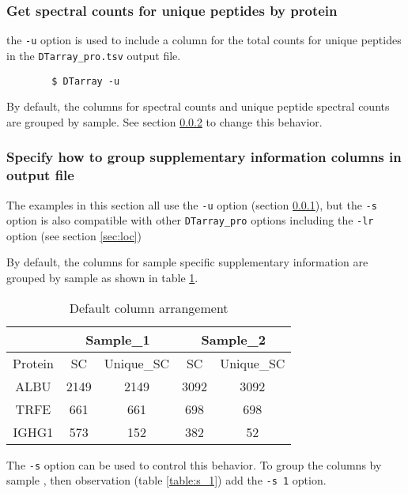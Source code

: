\documentclass[12pt]{article}
\begin{document}
	\subsubsection{Get spectral counts for unique peptides by protein} \label{sec:unique_sc}
	
	the \texttt{-u} option is used to include a column for the total counts for unique peptides in the \texttt{DTarray\_pro.tsv} output file.
	
	\begin{lstlisting}
		$ DTarray -u
	\end{lstlisting}
	
	By default, the columns for spectral counts and unique peptide spectral counts are grouped by sample.  See section \ref{sec:sup_info} to change this behavior.  
	
	\subsubsection{Specify how to group supplementary information columns in output file} \label{sec:sup_info}
	
	The examples in this section all use the \texttt{-u} option (section \ref{sec:unique_sc}), but the \texttt{-s} option is also compatible with other \texttt{DTarray\_pro} options including the \texttt{-lr} option (see section \ref{sec:loc})
	
	\bigskip
	\noindent
	By default, the columns for sample specific supplementary information are grouped by sample as shown in table \ref{table:s_0}.  
	
	\bigskip
	\begin{table}[h!]
		\centering
		\footnotesize
		\begin{tabular}{ccccc}
			\toprule
			& \multicolumn{2}{c}{Sample\_1}
			& \multicolumn{2}{c}{Sample\_2} \\
			\midrule
			Protein & SC & Unique\_SC & SC & Unique\_SC \\ 
			\midrule
			ALBU & 2149 & 2149 & 3092 & 3092 \\
			TRFE & 661 & 661 & 698 & 698 \\ 
			IGHG1 & 573 & 152 & 382 & 52 \\ 
			\toprule
		\end{tabular}
		\caption{Default column arrangement}
		\label{table:s_0}
	\end{table}
	
	\noindent
	The \texttt{-s} option can be used to control this behavior. To group the columns by sample , then observation (table \ref{table:s_1}) add the \texttt{-s 1} option.
	
\end{document}

